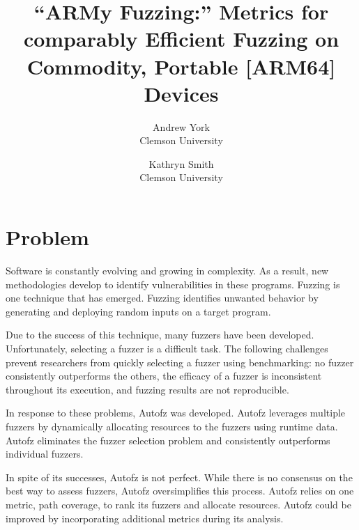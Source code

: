 

\date{}

\title{\Large \bf “ARMy Fuzzing:” Metrics for comparably Efficient Fuzzing on Commodity, 
Portable [ARM64] Devices}

\author{
{\rm Andrew York}\\
Clemson University
\and
{\rm Kathryn Smith}\\
Clemson University
} %

\maketitle

\section{Problem}

Software is constantly evolving and growing in complexity. As a result, 
new methodologies develop to identify vulnerabilities in these programs. 
Fuzzing is one technique that has emerged. Fuzzing identifies unwanted behavior 
by generating and deploying random inputs on a target program. \cite{Ecezia}

Due to the success of this technique, many fuzzers have been developed. 
Unfortunately, selecting a fuzzer is a difficult task. The following challenges 
prevent researchers from quickly selecting a fuzzer using benchmarking: no fuzzer 
consistently outperforms the others, the efficacy of a fuzzer is inconsistent 
throughout its execution, and fuzzing results are not reproducible. 

In response to these problems, Autofz was developed. Autofz leverages multiple 
fuzzers by dynamically allocating resources to the fuzzers using runtime data. 
Autofz eliminates the fuzzer selection problem and consistently outperforms 
individual fuzzers. 

In spite of its successes, Autofz is not perfect. While there is no consensus on
the best way to assess fuzzers, Autofz oversimplifies this process. Autofz relies
on one metric, path coverage, to rank its fuzzers and allocate resources. Autofz 
could be improved by incorporating additional metrics during its analysis. 

